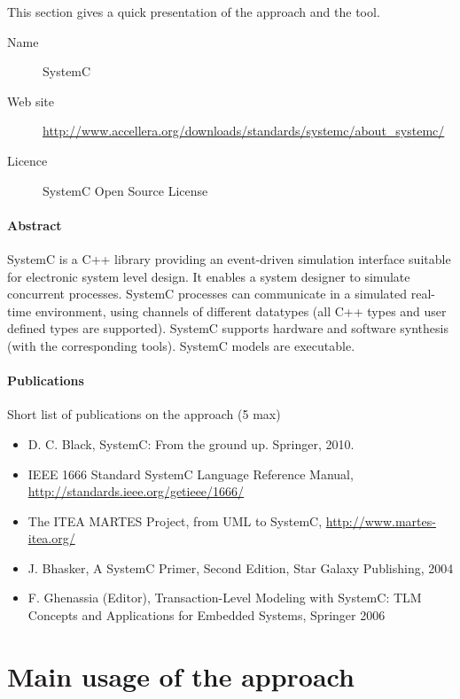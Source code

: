 This section gives a quick presentation of the approach and the tool.

\begin{description}
\item[Name] SystemC
\item[Web site] \url{http://www.accellera.org/downloads/standards/systemc/about_systemc/}
\item[Licence] SystemC Open Source License
\end{description}

\paragraph{Abstract}

SystemC is a C++ library providing an event-driven simulation interface suitable for electronic system level design. It enables a system designer to simulate concurrent processes. SystemC processes can communicate in a simulated real-time environment, using channels of different datatypes (all C++ types and user defined types are supported). SystemC supports hardware and software synthesis (with the corresponding tools). SystemC models are executable.


\paragraph{Publications} Short list of publications on the approach (5 max)

\begin{itemize}
\item D. C. Black, SystemC: From the ground up. Springer, 2010.
\item IEEE 1666 Standard SystemC Language Reference Manual, \url{http://standards.ieee.org/getieee/1666/}
\item The ITEA MARTES Project, from UML to SystemC, \url{http://www.martes-itea.org/}
\item J. Bhasker, A SystemC Primer, Second Edition, Star Galaxy Publishing, 2004
\item F. Ghenassia (Editor), Transaction-Level Modeling with SystemC: TLM Concepts and Applications for Embedded Systems, Springer 2006
\end{itemize}

\section{Main usage of the approach}
\label{main_usage}


